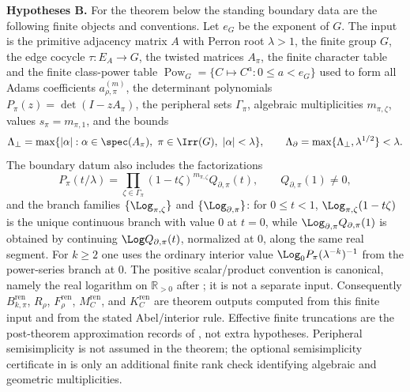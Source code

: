 \noindent\textbf{Hypotheses B.}
For the theorem below the standing boundary data are the following finite
objects and conventions.  Let \(e_G\) be the exponent of \(G\).  The input is
the primitive adjacency matrix \(A\) with Perron root \(\lambda>1\), the
finite group \(G\), the edge cocycle \(\tau:E_A\to G\), the twisted matrices
\(A_\pi\), the finite character table and the finite class-power table
\(\operatorname{Pow}_{G}=\{C\mapsto C^a:0\le a<e_G\}\) used to form all
Adams coefficients \(a_{\rho,\pi}^{(m)}\), the determinant polynomials
\(P_\pi(z)=\det(I-zA_\pi)\), the peripheral sets
\(\Gamma_\pi\), algebraic multiplicities \(m_{\pi,\zeta}\), values
\(s_\pi=m_{\pi,1}\), and the bounds
\[
  \Lambda_\perp
  =\max\{|\alpha|:\alpha\in\spec(A_\pi),\ \pi\in\Irr(G),\
    |\alpha|<\lambda\},
  \qquad
  \Lambda_\partial=\max\{\Lambda_\perp,\lambda^{1/2}\}<\lambda .
\]
The boundary datum also includes the factorizations
\[
  P_\pi(t/\lambda)=
  \prod_{\zeta\in\Gamma_\pi}(1-t\zeta)^{m_{\pi,\zeta}}Q_{\partial,\pi}(t),
  \qquad Q_{\partial,\pi}(1)\ne0,
\]
and the branch families \(\{\Log_{\pi,\zeta}\}\) and
\(\{\Log_{\partial,\pi}\}\): for \(0\le t<1\),
\(\Log_{\pi,\zeta}(1-t\zeta)\) is the unique continuous branch with value
\(0\) at \(t=0\), while
\(\Log_{\partial,\pi}Q_{\partial,\pi}(1)\) is obtained by continuing
\(\Log Q_{\partial,\pi}(t)\), normalized at \(0\), along the same real
segment.  For \(k\ge2\) one uses the ordinary interior value
\(\Log_0P_\pi(\lambda^{-k})^{-1}\) from the power-series branch at \(0\).
The positive scalar/product convention is canonical, namely the real
logarithm on \(\mathbb R_{>0}\) after
; it is not a separate input.
Consequently \(B_{k,\pi}^{\mathrm{ren}}\), \(R_\rho\),
\(F_\rho^{\mathrm{ren}}\), \(M_C^{\mathrm{ren}}\), and
\(K_C^{\mathrm{ren}}\) are theorem outputs computed from this finite input and
from the stated Abel/interior rule.  Effective finite truncations are the
post-theorem approximation records of
, not extra hypotheses.
Peripheral semisimplicity is not assumed in the theorem; the optional
semisimplicity certificate in
 is only an additional finite
rank check identifying algebraic and geometric multiplicities.

